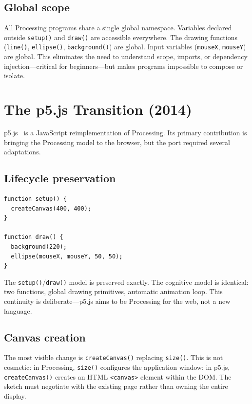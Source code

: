 \documentclass[10pt,letterpaper,twocolumn]{article}
\begin{document}
\subsection{Global scope}

All Processing programs share a single global namespace. Variables declared outside \texttt{setup()} and \texttt{draw()} are accessible everywhere. The drawing functions (\texttt{line()}, \texttt{ellipse()}, \texttt{background()}) are global. Input variables (\texttt{mouseX}, \texttt{mouseY}) are global. This eliminates the need to understand scope, imports, or dependency injection---critical for beginners---but makes programs impossible to compose or isolate.


\section{The p5.js Transition (2014)}
\label{sec:p5js}

p5.js~\citep{mccarthy2015p5js} is a JavaScript reimplementation of Processing. Its primary contribution is bringing the Processing model to the browser, but the port required several adaptations.

\subsection{Lifecycle preservation}

\begin{lstlisting}[style=p5style,caption={Minimal p5.js sketch.}]
function setup() {
  createCanvas(400, 400);
}

function draw() {
  background(220);
  ellipse(mouseX, mouseY, 50, 50);
}
\end{lstlisting}

The \texttt{setup()}/\texttt{draw()} model is preserved exactly. The cognitive model is identical: two functions, global drawing primitives, automatic animation loop. This continuity is deliberate---p5.js aims to be Processing for the web, not a new language.

\subsection{Canvas creation}

The most visible change is \texttt{createCanvas()} replacing \texttt{size()}. This is not cosmetic: in Processing, \texttt{size()} configures the application window; in p5.js, \texttt{createCanvas()} creates an HTML \texttt{<canvas>} element within the DOM. The sketch must negotiate with the existing page rather than owning the entire display.
\end{document}
